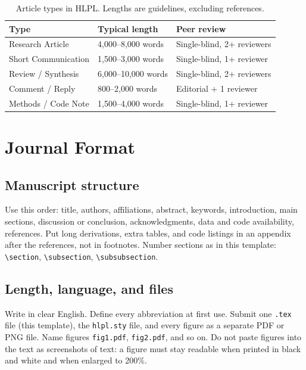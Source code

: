 \documentclass[9pt,a4paper,twocolumn]{article}
\begin{document}
\begin{table}[h]
\centering
\caption{Article types in HLPL. Lengths are guidelines, excluding references.}
\label{tab:types}
\footnotesize
{} %
\begin{tabular}{@{}p{20mm}p{28mm}p{28mm}@{}}
\toprule
\textbf{Type} & \textbf{Typical length} & \textbf{Peer review} \\
\midrule
Research Article & 4,000--8,000 words & Single-blind, 2+ reviewers \\
Short Communication & 1,500--3,000 words & Single-blind, 1+ reviewer \\
Review / Synthesis & 6,000--10,000 words & Single-blind, 2+ reviewers \\
Comment / Reply & 800--2,000 words & Editorial + 1 reviewer \\
Methods / Code Note & 1,500--4,000 words & Single-blind, 1+ reviewer \\
\bottomrule
\end{tabular}
\end{table}

\section{Journal Format}
\label{sec:format}
\subsection{Manuscript structure}
Use this order: title, authors, affiliations, abstract, keywords, introduction, main sections, discussion or conclusion, acknowledgments, data and code availability, references. Put long derivations, extra tables, and code listings in an appendix after the references, not in footnotes. Number sections as in this template: \verb|\section|, \verb|\subsection|, \verb|\subsubsection|.

\subsection{Length, language, and files}
Write in clear English. Define every abbreviation at first use. Submit one \verb|.tex| file (this template), the \verb|hlpl.sty| file, and every figure as a separate PDF or PNG file. Name figures \verb|fig1.pdf|, \verb|fig2.pdf|, and so on. Do not paste figures into the text as screenshots of text: a figure must stay readable when printed in black and white and when enlarged to 200\%.
\end{document}
